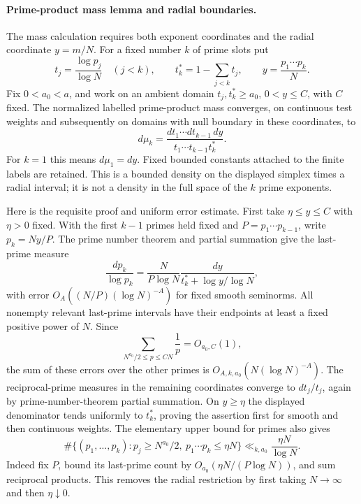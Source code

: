 
\paragraph{Prime-product mass lemma and radial boundaries.}
The mass calculation requires both exponent coordinates and the
radial coordinate $y=m/N$. For a fixed number $k$ of prime slots put
\[
 t_j=\frac{\log p_j}{\log N}\quad(j<k),\qquad
 t_k^*=1-\sum_{j<k}t_j,\qquad y=\frac{p_1\cdots p_k}{N}.
\]
Fix $0<a_0<a$, and work on an ambient domain
$t_j,t_k^*\ge a_0$, $0<y\le C$, with $C$ fixed.
The normalized labelled prime-product mass converges, on continuous
test weights and subsequently on domains with null boundary in these
coordinates, to
\[
 d\mu_k=\frac{dt_1\cdots dt_{k-1}\,dy}
 {t_1\cdots t_{k-1}t_k^*}.
\]
For $k=1$ this means $d\mu_1=dy$. Fixed bounded constants attached
to the finite labels are retained. This is a bounded density on the
displayed simplex times a radial interval; it is not a density in
the full space of the $k$ prime exponents.

Here is the requisite proof and uniform error estimate. First take
$\eta\le y\le C$ with $\eta>0$ fixed. With the first $k-1$ primes
held fixed and $P=p_1\cdots p_{k-1}$, write $p_k=Ny/P$. The prime
number theorem and partial summation give the last-prime measure
\[
 \frac{dp_k}{\log p_k}
 =\frac{N}{P\log N}\frac{dy}{t_k^*+\log y/\log N},
\]
with error $O_A((N/P)(\log N)^{-A})$ for fixed smooth seminorms.
All nonempty relevant last-prime intervals have their endpoints at
least a fixed positive power of $N$. Since
\[
 \sum_{N^{a_0}/2\le p\le CN}\frac1p=O_{a_0,C}(1),
\]
the sum of these errors over the other primes is
$O_{A,k,a_0}(N(\log N)^{-A})$.
The reciprocal-prime measures in the remaining coordinates converge
to $dt_j/t_j$, again by prime-number-theorem partial summation.
On $y\ge\eta$ the displayed denominator tends uniformly to $t_k^*$,
proving the assertion first for smooth and then continuous weights.
The elementary upper bound for primes also gives
\[
 \#\{(p_1,\ldots,p_k):p_j\ge N^{a_0}/2,\ 
                  p_1\cdots p_k\le\eta N\}
 \ll_{k,a_0}\frac{\eta N}{\log N}.
\]
Indeed fix $P$, bound its last-prime count by
$O_{a_0}(\eta N/(P\log N))$, and sum reciprocal products.
This removes the radial restriction by first taking $N\to\infty$
and then $\eta\downarrow0$.

